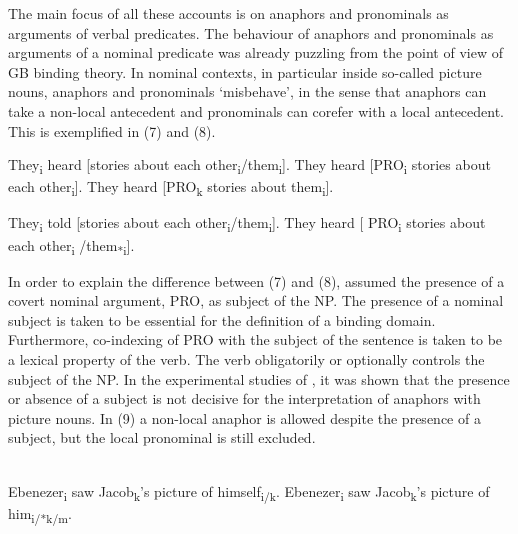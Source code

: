 \documentclass[output=paper]{langsci/langscibook}
\begin{document}
The main focus of all these accounts is on anaphors and pronominals as arguments of verbal predicates. The behaviour of anaphors and pronominals as arguments of a nominal predicate was already puzzling from the point of view of GB binding theory. In nominal contexts, in particular inside so-called picture nouns, anaphors and pronominals ‘misbehave’, in the sense that anaphors can take a non-local antecedent and pronominals can corefer with a local antecedent. This is exemplified in (7) and (8). 

\ea%
    \citep[166–167]{Chomsky1986Knowledge}\label{ex:wein:7}
\ea  They\textsubscript{i} heard [stories about each other\textsubscript{i}\slash them\textsubscript{i}].
\ex  They heard [PRO\textsubscript{i} stories about each other\textsubscript{i}].
\ex  They heard [PRO\textsubscript{k} stories about them\textsubscript{i}].
    \z
\z

\ea%
    \label{ex:wein:8}
    \ea They\textsubscript{i} told [stories about each other\textsubscript{i}\slash *them\textsubscript{i}].
    \ex They heard [ PRO\textsubscript{i} stories about each other\textsubscript{i} /them\textsubscript{*i}].
    \z
\z

In order to explain the difference between (7) and (8), \citet{Chomsky1986Knowledge} assumed the presence of a covert nominal argument, PRO, as subject of the NP. The presence of a nominal subject is taken to be essential for the definition of a binding domain. Furthermore, co-indexing of PRO with the subject of the sentence is taken to be a lexical property of the verb. The verb obligatorily or optionally controls the subject of the NP. In the experimental studies of \citet{Runner2005}, it was shown that the presence or absence of a subject is not decisive for the interpretation of anaphors with picture nouns. In (9) a non-local anaphor is allowed despite the presence of a subject, but the local pronominal is still excluded.

\ea%
    \citet[597]{Runner2005}\label{ex:wein:9}\\
    \ea Ebenezer\textsubscript{i} saw Jacob\textsubscript{k}'s picture of himself\textsubscript{i/k}.
    \ex Ebenezer\textsubscript{i} saw Jacob\textsubscript{k}'s picture of him\textsubscript{i/*k/m}.
    \z
\z    
\end{document}
